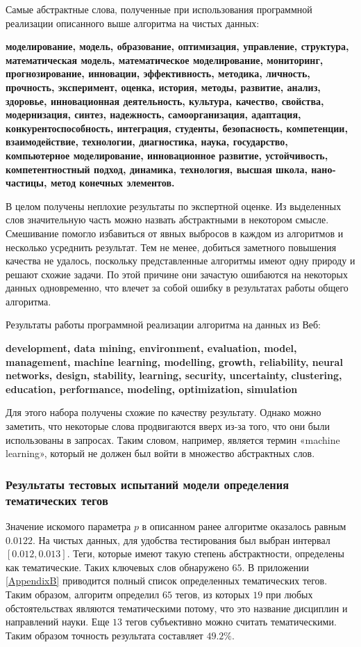 Самые абстрактные слова, полученные при использования программной реализации описанного выше алгоритма на чистых данных:

\textbf{моделирование, модель, образование, оптимизация, управление, структура, математическая модель, математическое моделирование, мониторинг, прогнозирование, инновации, эффективность, методика, личность, прочность, эксперимент, оценка, история, методы, развитие, анализ, здоровье, инновационная деятельность, культура, качество, свойства, модернизация, синтез, надежность, самоорганизация, адаптация, конкурентоспособность, интеграция, студенты, безопасность, компетенции, взаимодействие, технологии, диагностика, наука, государство, компьютерное моделирование, инновационное развитие, устойчивость, компетентностный подход, динамика, технология, высшая школа, нано-
частицы, метод конечных элементов.}

В целом получены неплохие результаты по экспертной оценке. Из выделенных слов значительную часть можно назвать абстрактными в некотором смысле. Смешивание помогло избавиться от явных выбросов в каждом из алгоритмов и несколько усреднить результат. Тем не менее, добиться заметного повышения качества не удалось, поскольку представленные алгоритмы имеют одну природу и решают схожие задачи. По этой причине они зачастую ошибаются на некоторых данных одновременно, что влечет за собой ошибку в результатах работы общего алгоритма.

Результаты работы программной реализации алгоритма на данных из Веб:

\textbf{development, data mining, environment, evaluation, model, management, machine learning, modelling, growth, reliability, neural networks, design, stability, learning, security, uncertainty, clustering, education, performance, modeling, optimization, simulation}

Для этого набора получены схожие по качеству результату. Однако можно заметить, что некоторые слова продвигаются вверх из-за того, что они были использованы в запросах. Таким словом, например, является термин «machine learning», который не должен был войти в множество абстрактных слов.

\subsubsection{Результаты тестовых испытаний модели определения тематических тегов}
Значение искомого параметра $p$ в описанном ранее алгоритме оказалось равным $0.0122$.  На чистых данных, для удобства тестирования был выбран интервал $[0.012, 0.013]$. Теги, которые имеют такую степень абстрактности, определены как тематические. Таких ключевых слов обнаружено $65$. В приложении \ref{AppendixB} приводится полный список определенных тематических тегов. Таким образом, алгоритм определил $65$ тегов, из которых $19$ при любых обстоятельствах являются тематическими потому, что это название дисциплин и направлений науки. Еще $13$ тегов субъективно можно считать тематическими. Таким образом точность результата составляет $49.2\%$.

